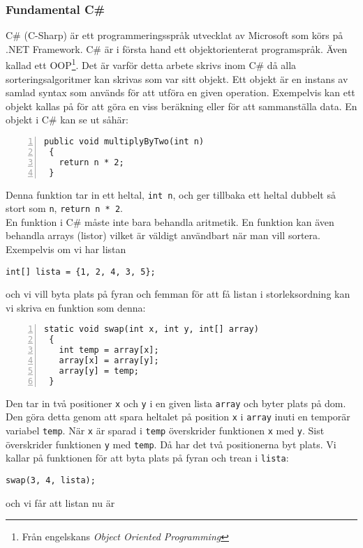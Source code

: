 \documentclass[a4]{article}
\begin{document}
\subsubsection{Fundamental C\#}
C\# (C-Sharp) är ett programmeringsspråk utvecklat av Microsoft som körs på .NET Framework. \cite{7} C\# är i första hand ett objektorienterat programspråk. Även kallad ett OOP\footnote{Från engelskans \textit{Object Oriented Programming}}. Det är varför detta arbete skrivs inom C\# då alla sorteringsalgoritmer kan skrivas som var sitt objekt. Ett objekt är en instans av samlad syntax som används för att utföra en given operation. Exempelvis kan ett objekt kallas på för att göra en viss beräkning eller för att sammanställa data. En objekt i C\# kan se ut såhär:
\begin{lstlisting}[style=mystyle, numbers=left]
 public void multiplyByTwo(int n)
 {
   return n * 2;
 }
\end{lstlisting}
Denna funktion tar in ett heltal, \lstinline{int n}, och ger tillbaka ett heltal dubbelt så stort som \lstinline{n}, \lstinline{return n * 2}.\\
En funktion i C\# måste inte bara behandla aritmetik. En funktion kan även behandla arrays (listor) vilket är väldigt användbart när man vill sortera. Exempelvis om vi har listan
\begin{lstlisting}[style=mystyle, numbers=none]
 int[] lista = {1, 2, 4, 3, 5};
\end{lstlisting}
och vi vill byta plats på fyran och femman för att få listan i storleksordning kan vi skriva en funktion som denna:
\begin{lstlisting}[style=mystyle, numbers=left]
 static void swap(int x, int y, int[] array)
 {
   int temp = array[x];
   array[x] = array[y];
   array[y] = temp;
 }
\end{lstlisting}
Den tar in två positioner \lstinline{x} och \lstinline{y} i en given lista \lstinline{array} och byter plats på dom. Den göra detta genom att spara heltalet på position \lstinline{x} i \lstinline{array} inuti en temporär variabel \lstinline{temp}. När \lstinline{x} är sparad i \lstinline{temp} överskrider funktionen \lstinline{x} med \lstinline{y}. Sist överskrider funktionen \lstinline{y} med \lstinline{temp}. Då har det två positionerna byt plats. Vi kallar på funktionen för att byta plats på fyran och trean i \lstinline{lista}:
\begin{lstlisting}[style=mystyle, numbers=none]
 swap(3, 4, lista);
\end{lstlisting}
och vi får att listan nu är 
\end{document}
